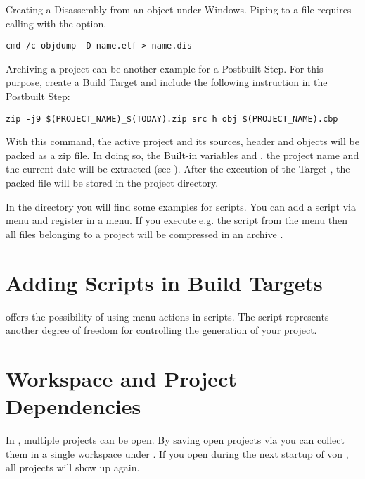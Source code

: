 
Creating a Disassembly from an object under Windows. Piping to a file requires calling  with the  option.

\begin{lstlisting}
cmd /c objdump -D name.elf > name.dis
\end{lstlisting}

Archiving a project can be another example for a Postbuilt Step. For this purpose, create a Build Target  and include the following instruction in the Postbuilt Step:

\begin{lstlisting}
zip -j9 $(PROJECT_NAME)_$(TODAY).zip src h obj $(PROJECT_NAME).cbp
\end{lstlisting}

With this command, the active project and its sources, header and objects will be packed as a zip file. In doing so, the Built-in variables  and , the project name and the current date will be extracted (see ). After the execution of the Target , the packed file will be stored in the project directory.

In the  directory you will find some examples for scripts. You can add a script via menu  and register in a menu. If you execute e.g. the script  from the menu then all files belonging to a project will be compressed in an archive .

\section{Adding Scripts in Build Targets}

\codeblocks offers the possibility of using menu actions in scripts. The script represents another degree of freedom for controlling the generation of your project.


\section{Workspace and Project Dependencies}

In \codeblocks, multiple projects can be open. By saving open projects via  you can collect them in a single workspace under . If you open  during the next startup of von \codeblocks, all projects will show up again.


